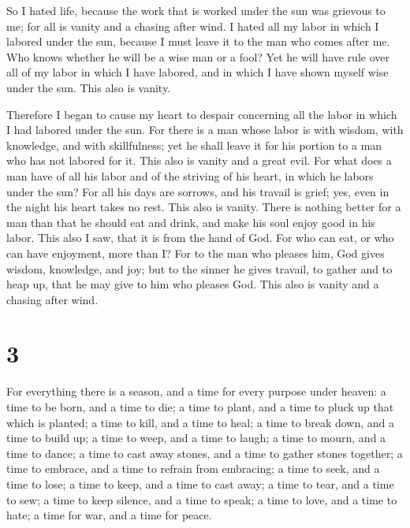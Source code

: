  So I hated life, because the work that is worked under the
sun was grievous to me; for all is vanity and a chasing after wind.
 I hated all my labor in which I labored under the sun,
because I must leave it to the man who comes after me.  Who
knows whether he will be a wise man or a fool? Yet he will have rule
over all of my labor in which I have labored, and in which I have shown
myself wise under the sun. This also is vanity.

 Therefore I began to cause my heart to despair concerning
all the labor in which I had labored under the sun.  For
there is a man whose labor is with wisdom, with knowledge, and with
skillfulness; yet he shall leave it for his portion to a man who has not
labored for it. This also is vanity and a great evil.  For
what does a man have of all his labor and of the striving of his heart,
in which he labors under the sun?  For all his days are
sorrows, and his travail is grief; yes, even in the night his heart
takes no rest. This also is vanity.  There is nothing
better for a man than that he should eat and drink, and make his soul
enjoy good in his labor. This also I saw, that it is from the hand of
God.  For who can eat, or who can have enjoyment, more than
I?  For to the man who pleases him, God gives wisdom,
knowledge, and joy; but to the sinner he gives travail, to gather and to
heap up, that he may give to him who pleases God. This also is vanity
and a chasing after wind.

\hypertarget{section-2}{%
\section{3}\label{section-2}}

 For everything there is a season, and a time for every
purpose under heaven:  a time to be born, and a time to die;
a time to plant, and a time to pluck up that which is planted;
 a time to kill, and a time to heal; a time to break down,
and a time to build up;  a time to weep, and a time to
laugh; a time to mourn, and a time to dance;  a time to cast
away stones, and a time to gather stones together; a time to embrace,
and a time to refrain from embracing;  a time to seek, and a
time to lose; a time to keep, and a time to cast away;  a
time to tear, and a time to sew; a time to keep silence, and a time to
speak;  a time to love, and a time to hate; a time for war,
and a time for peace.

